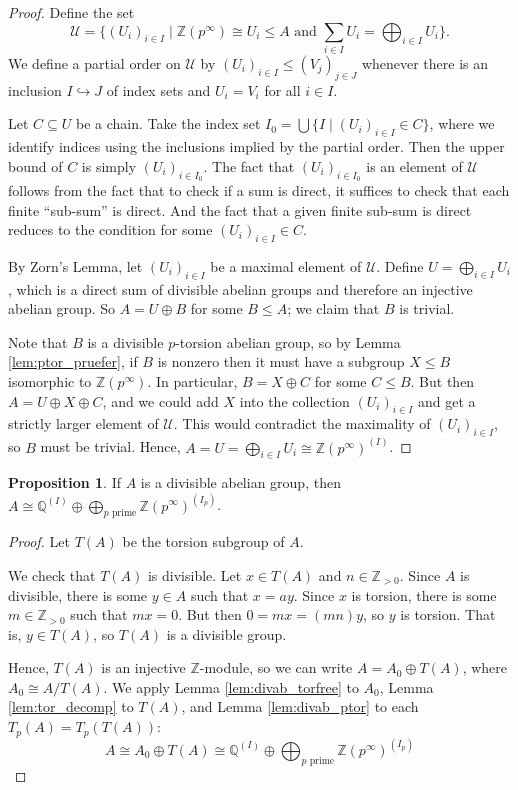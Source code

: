 \documentclass[12pt]{article}
\theoremstyle{definition}
\newtheorem{proposition}{Proposition}
\newcommand{\Z}{\mathbb{Z}}
\newcommand{\Q}{\mathbb{Q}}
\newcommand{\<}{\langle}
\renewcommand{\>}{\rangle}
\newcommand{\iso}{\cong}
\newcommand{\seq}{\subseteq}
\newcommand{\inc}{\hookrightarrow}
\renewcommand{\_}[1]{{_{#1}}}
\begin{document}
\begin{proof}
    Define the set
    \[\textstyle
        \mathcal{U} = \{(U_i)_{i \in I} \mid \Z(p^\infty) \iso U_i \leq A \text{ and } \sum_{i \in I} U_i = \bigoplus_{i \in I} U_i\}.
    \]
    We define a partial order on $\mathcal{U}$ by $(U_i)_{i \in I} \leq (V_j)_{j \in J}$ whenever there is an inclusion $I \inc J$ of index sets and $U_i = V_i$ for all $i \in I$.

    Let $C \seq U$ be a chain.
    Take the index set $I_0 = \bigcup\{I \mid (U_i)_{i \in I} \in C\}$, where we identify indices using the inclusions implied by the partial order.
    Then the upper bound of $C$ is simply $(U_i)_{i \in I_0}$.
    The fact that $(U_i)_{i \in I_0}$ is an element of $\mathcal{U}$ follows from the fact that to check if a sum is direct, it suffices to check that each finite ``sub-sum'' is direct.
    And the fact that a given finite sub-sum is direct reduces to the condition for some $(U_i)_{i \in I} \in C$.

    By Zorn's Lemma, let $(U_i)_{i \in I}$ be a maximal element of $\mathcal{U}$.
    Define $U = \bigoplus_{i \in I} U_i$, which is a direct sum of divisible abelian groups and therefore an injective abelian group.
    So $A = U \oplus B$ for some $B \leq A$; we claim that $B$ is trivial.

    Note that $B$ is a divisible $p$-torsion abelian group, so by Lemma \ref{lem:ptor_pruefer}, if $B$ is nonzero then it must have a subgroup $X \leq B$ isomorphic to $\Z(p^\infty)$.
    In particular, $B = X \oplus C$ for some $C \leq B$.
    But then $A = U \oplus X \oplus C$, and we could add $X$ into the collection $(U_i)_{i \in I}$ and get a strictly larger element of $\mathcal{U}$.
    This would contradict the maximality of $(U_i)_{i \in I}$, so $B$ must be trivial.
    Hence, $A = U = \bigoplus_{i \in I} U_i \iso \Z(p^\infty)^{(I)}$.
\end{proof}

\begin{proposition}
    If $A$ is a divisible abelian group, then $A \iso \Q^{(I)} \oplus \bigoplus_{p \text{ prime}} \Z(p^\infty)^{(I_p)}$.
\end{proposition}

\begin{proof}
    Let $T(A)$ be the torsion subgroup of $A$.

    We check that $T(A)$ is divisible.
    Let $x \in T(A)$ and $n \in \Z_{>0}$.
    Since $A$ is divisible, there is some $y \in A$ such that $x = ay$.
    Since $x$ is torsion, there is some $m \in \Z_{>0}$ such that $mx = 0$.
    But then $0 = mx = (mn)y$, so $y$ is torsion.
    That is, $y \in T(A)$, so $T(A)$ is a divisible group. 

    Hence, $T(A)$ is an injective $\Z$-module, so we can write $A = A_0 \oplus T(A)$, where $A_0 \iso A/T(A)$.
    We apply Lemma \ref{lem:divab_torfree} to $A_0$, Lemma \ref{lem:tor_decomp} to $T(A)$, and Lemma \ref{lem:divab_ptor} to each $T_p(A) = T_p(T(A))$:
    \[
        A
            \iso A_0 \oplus T(A)
            \iso \Q^{(I)} \oplus \bigoplus_{p \text{ prime}} \Z(p^\infty)^{(I_p)}
    \]
\end{proof}
\end{document}
